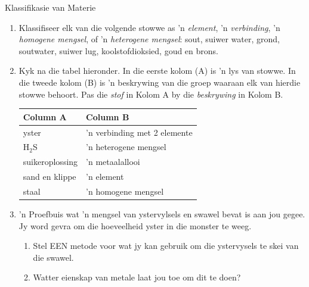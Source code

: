 \begin{eocexercises}{Klassifikasie van Materie}
{\begin{enumerate}[noitemsep, label=\textbf{\arabic*}. ]
\label{m38706*uid144}\item Klassifiseer elk van die volgende stowwe as 'n \textsl{element}, 'n \textsl{verbinding}, 'n \textsl{homogene mengsel}, of 'n \textsl{heterogene mengsel}: sout, suiwer water, grond, soutwater, suiwer lug, koolstofdioksied, goud en brons.\newline
\label{m38706*uid145}\item Kyk na die tabel hieronder. In die eerste kolom (A) is 'n lys van stowwe. In die tweede kolom (B) is 'n beskrywing van die groep waaraan elk van hierdie stowwe behoort. Pas die \textsl{stof} in Kolom A by die \textsl{beskrywing} in Kolom B.
          \begin{table}[H]
        \begin{center}
      \label{m38706*id68147}
      \begin{tabular}{|l|l|}\hline
\textbf{Column A} & \textbf{Column B} \\ \hline
yster & 'n verbinding met 2 elemente \\ \hline
H$_\text{2}$S & 'n heterogene mengsel \\ \hline
suikeroplossing & 'n metaalallooi \\ \hline
sand en klippe & 'n element \\ \hline
staal & 'n homogene mengsel \\ \hline
    \end{tabular}
      \end{center}
\end{table}
    \par
\label{m38706*uid146}\item 'n Proefbuis wat 'n mengsel van ystervylsels en swawel bevat is aan jou gegee. Jy word gevra om die hoeveelheid yster in die monster te weeg. 
\label{m38706*id68262}\begin{enumerate}[noitemsep, label=\textbf{\alph*}. ] 
            \label{m38706*uid147}\item Stel EEN metode voor wat jy kan gebruik om die ystervysels te skei van die swawel.
\label{m38706*uid148}\item Watter eienskap van metale laat jou toe om dit te doen?

\end{enumerate}
\end{enumerate}}
\end{eocexercises}
